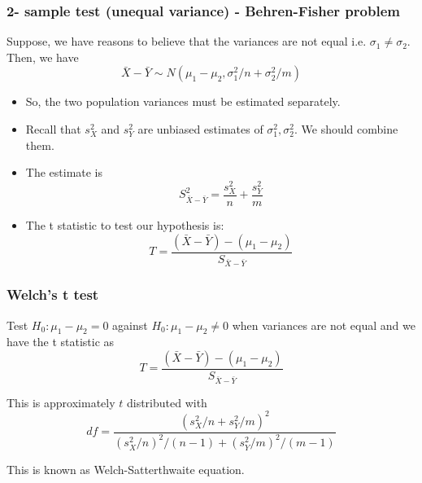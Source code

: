 \documentclass{beamer}\usepackage[]{graphicx}\usepackage[]{color}
\begin{document}
\begin{frame}

\frametitle{2- sample test (unequal variance) - Behren-Fisher problem}

Suppose, we have reasons to believe that the variances are not equal i.e. $\sigma_1\ne\sigma_2$. Then, we have
$$\bar X-\bar Y \sim N(\mu_1-\mu_2,\sigma_1^2/n+\sigma_2^2/m)$$
\begin{itemize}
\item So, the two population variances must be estimated separately. 
\item Recall that $s_X^2$ and $s_Y^2$ are unbiased estimates of $\sigma_1^2,\sigma_2^2$. We should combine them.
\item The estimate is $$S_{\bar X-\bar Y}^2 = \frac{s_X^2}{n} + \frac{s_Y^2}{m}$$
\item The t statistic to test our hypothesis is:
$$T = \frac{(\bar X-\bar Y)-(\mu_1-\mu_2)}{S_{\bar X-\bar Y}}$$
\end{itemize}

\end{frame}


\begin{frame}

\frametitle{Welch's t test}

Test $H_0:\mu_1-\mu_2=0$ against $H_0: \mu_1-\mu_2\ne 0$ when variances are not equal and we have the t statistic as
$$T = \frac{(\bar X-\bar Y)-(\mu_1-\mu_2)}{S_{\bar X-\bar Y}}$$

This is approximately $t$ distributed with 
$$df=\frac{(s_X^2/n+s_Y^2/m)^2}{(s_X^2/n)^2/(n-1)+(s_Y^2/m)^2/(m-1)}$$

This is known as  Welch-Satterthwaite equation.

\end{frame}
\end{document}
